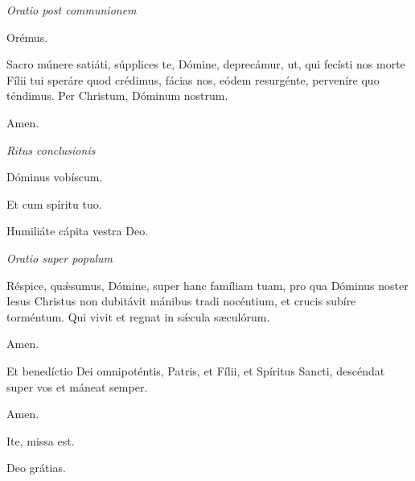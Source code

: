 \textit{Oratio post communionem}

Orémus.

Sacro múnere satiáti, súpplices te, Dómine, deprecámur, ut, qui fecísti nos morte Fílii tui speráre quod crédimus, fácias nos, eódem resurgénte, perveníre quo téndimus. Per Christum, Dóminum nostrum.

\Rbardot{} Amen.

\textit{Ritus conclusionis}

\Vbardot{} Dóminus vobíscum.

\Rbardot{} Et cum spíritu tuo.

\Vbardot{} Humiliáte cápita vestra Deo.

\textit{Oratio super populum}

Réspice, quǽsumus, Dómine, super hanc famíliam tuam, pro qua Dóminus noster Iesus Christus non dubitávit mánibus tradi nocéntium, et crucis subíre torméntum. Qui vivit et regnat in sǽcula sæculórum.

\Rbardot{} Amen.

Et benedíctio Dei omnipoténtis, Patris, et Fílii, \grecross{} et Spíritus Sancti, descéndat super vos et máneat semper.

\Rbardot{} Amen.

\Vbardot{} Ite, missa est.

\Rbardot{} Deo grátias.
